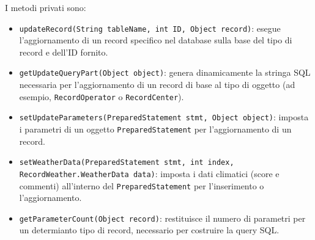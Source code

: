 I metodi privati sono:
\begin{itemize}
    \item \texttt{updateRecord(String tableName, int ID, Object record)}:
          esegue l'aggiornamento di un record specifico nel database sulla base del tipo di record e dell'ID fornito.
    \item \texttt{getUpdateQueryPart(Object object)}:
          genera dinamicamente la stringa SQL necessaria per l'aggiornamento di un record di base al tipo di oggetto (ad esempio, \texttt{RecordOperator} o \texttt{RecordCenter}).
    \item \texttt{setUpdateParameters(PreparedStatement stmt, Object object)}:
          imposta i parametri di un oggetto \texttt{PreparedStatement} per l'aggiornamento di un record.
    \item \texttt{setWeatherData(PreparedStatement stmt, int index, RecordWeather.WeatherData data)}:
          imposta i dati climatici (score e commenti) all'interno del \texttt{PreparedStatement} per l'inserimento o l'aggiornamento.
    \item \texttt{getParameterCount(Object record)}:
          restituisce il numero di parametri per un determianto tipo di record, necessario per costruire la query SQL.
\end{itemize}

